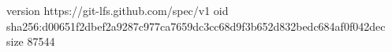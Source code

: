 version https://git-lfs.github.com/spec/v1
oid sha256:d00651f2dbef2a9287c977ca7659dc3cc68d9f3b652d832bedc684af0f042dec
size 87544
